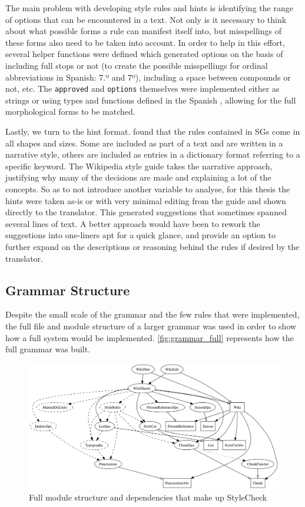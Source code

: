 The main problem with developing style rules and hints is identifying the range of options that can be encountered in a text. Not only is it necessary to think about what possible forms a rule can manifest itself into, but misspellings of these forms also need to be taken into account. In order to help in this effort, several helper functions were defined which generated options on the basis of including full stops or not (to create the possible misspellings for ordinal abbreviations in Spanish: 7.º and 7º), including a space between compounds or not, etc. The \texttt{approved} and \texttt{options} themselves were implemented either as strings or using types and functions defined in the Spanish , allowing for the full morphological forms to be matched.

Lastly, we turn to the hint format. \textcite{vidal2013guia} found that the rules contained in \acp{SG} come in all shapes and sizes. Some are included as part of a text and are written in a narrative style, others are included as entries in a dictionary format referring to a specific keyword. The Wikipedia style guide takes the narrative approach, justifying why many of the decisions are made and explaining a lot of the concepts. So as to not introduce another variable to analyse, for this thesis the hints were taken as-is or with very minimal editing from the guide and shown directly to the translator. This generated suggestions that sometimes spanned several lines of text. A better approach would have been to rework the suggestions into one-liners apt for a quick glance, and provide an option to further expand on the descriptions or reasoning behind the rules if desired by the translator.


\subsection{Grammar Structure}

\noindent Despite the small scale of the grammar and the few rules that were implemented, the full file and module structure of a larger grammar was used in order to show how a full system would be implemented. \autoref{fig:grammar_full} represents how the full grammar was built.

\begin{figure}[h]
\myfloatalign
\includegraphics[width=\textwidth]{img/grammar/grammar_full}
\caption{Full module structure and dependencies that make up StyleCheck}
\label{fig:grammar_full}
\end{figure}

